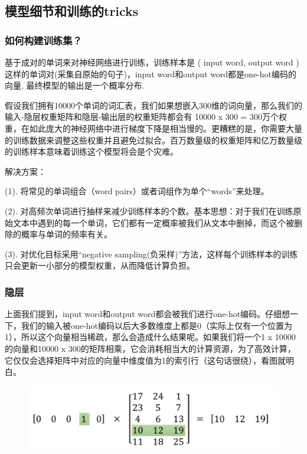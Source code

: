 \documentclass[12pt]{article}
\begin{document}
\subsection{模型细节和训练的tricks\cite{Embedding_Common_Methods_In_Reference_Systems}\cite{Understand_Skip_Gram_Model_in_Word2Vec}}
\subsubsection{如何构建训练集？}
基于成对的单词来对神经网络进行训练，训练样本是 ( input word, output word ) 这样的单词对(采集自原始的句子)，input word和output word都是one-hot编码的向量, 最终模型的输出是一个概率分布.

假设我们拥有10000个单词的词汇表，我们如果想嵌入300维的词向量，那么我们的输入-隐层权重矩阵和隐层-输出层的权重矩阵都会有 10000 x 300 = 300万个权重，在如此庞大的神经网络中进行梯度下降是相当慢的。更糟糕的是，你需要大量的训练数据来调整这些权重并且避免过拟合。百万数量级的权重矩阵和亿万数量级的训练样本意味着训练这个模型将会是个灾难。

解决方案：

(1). 将常见的单词组合（word pairs）或者词组作为单个“words”来处理。

(2). 对高频次单词进行抽样来减少训练样本的个数。基本思想：对于我们在训练原始文本中遇到的每一个单词，它们都有一定概率被我们从文本中删掉，而这个被删除的概率与单词的频率有关。

(3). 对优化目标采用“negative sampling(负采样)”方法，这样每个训练样本的训练只会更新一小部分的模型权重，从而降低计算负担。

\subsubsection{隐层}
上面我们提到，input word和output word都会被我们进行one-hot编码。仔细想一下，我们的输入被one-hot编码以后大多数维度上都是0（实际上仅有一个位置为1），所以这个向量相当稀疏，那么会造成什么结果呢。如果我们将一个1 x 10000的向量和10000 x 300的矩阵相乘，它会消耗相当大的计算资源，为了高效计算，它仅仅会选择矩阵中对应的向量中维度值为1的索引行（这句话很绕），看图就明白。
\begin{figure}[H]
    \centering
    \includegraphics[width=.6\textwidth]{fig/Embedding_Hidden_Layer_Compute_Trick.png}
\end{figure}
\end{document}
